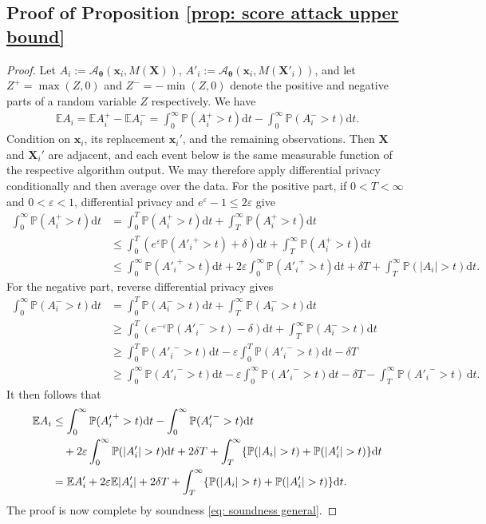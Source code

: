 \documentclass[letterpaper,12pt]{article}
\renewcommand{\d}{\mathrm{d}}
\numberwithin{equation}{section}
\theoremstyle{plain}
\numberwithin{Theorem}{section}
\numberwithin{proposition}{section}
\numberwithin{Lemma}{section}
{
	\theoremstyle{definition}
	\newtheorem{Definition}{Definition}
	\newtheorem{example}{Example}
	\numberwithin{example}{section}
	\newtheorem{fact}{Fact}
	\numberwithin{fact}{section}
	\newtheorem{remark}{Remark}
}
\newcommand{\rev}[1]{#1}
\newcommand{\A}{\mathcal{A}}
\newcommand{\Pro}{\mathbb{P}}
\newcommand{\1}{\mathbbm{1}}
\def\bth{{\boldsymbol{\theta}}}
\def\E{\mathbb{E}}
\begin{document}
\subsection{Proof of Proposition \ref{prop: score attack upper bound}}\label{sec: proof of prop: score attack upper bound}
\begin{proof}
	Let $A_i := \A_\bth (\bm x_i, M(\bm X))$, $A'_i := \A_\bth (\bm x_i, M(\bm X'_i))$, and let $Z^+ = \max(Z, 0)$ and $Z^- = -\min(Z, 0)$ denote the positive and negative parts of a \rev{random variable} $Z$ respectively. We have
	\begin{align*}
		\E A_i = \E A_i^+ - \E A_i^- = \int_0^\infty \Pro(A_i^+ > t) \d t - \int_0^\infty \Pro(A_i^- > t) \d t.
	\end{align*}
	Condition on $\bm x_i$, its replacement $\bm x_i'$, and the remaining observations. Then $\bm X$ and $\bm X_i'$ are adjacent, and each event below is the same measurable function of the respective algorithm output. We may therefore apply differential privacy conditionally and then average over the data.
		For the positive part, if $0 < T < \infty$ and $0 < \varepsilon < 1$, differential privacy and $e^\varepsilon-1\leq2\varepsilon$ give
	\begin{align*}
		\int_0^\infty \Pro(A_i^+ > t) \d t &= \int_0^T \Pro(A_i^+ > t) \d t + \int_T^\infty \Pro(A_i^+ > t) \d t \\
		&\leq \int_0^T \left(e^\varepsilon\Pro({A'_i}^+ > t) + \delta\right)\d t + \int_T^\infty \Pro(A_i^+ > t) \d t \\
		&\leq \int_0^\infty \Pro({A'_i}^+ > t) \d t + 2\varepsilon\int_0^\infty \Pro({A'_i}^+ > t) \d t + \delta T + \int_T^\infty \Pro(|A_i| > t) \d t.
	\end{align*}
		For the negative part, reverse differential privacy gives
	\begin{align*}
		\int_0^\infty \Pro(A_i^- > t) \d t &= \int_0^T \Pro(A_i^- > t) \d t + \int_T^\infty \Pro(A_i^- > t) \d t \\
			& \geq \int_0^T \left(e^{-\varepsilon} \Pro({A'_i}^- > t) - \delta\right)\d t + \int_T^\infty \Pro(A_i^- > t) \d t \\
			&\geq \int_0^T \Pro({A'_i}^- > t) \d t - \varepsilon\int_0^T \Pro({A'_i}^- > t) \d t- \delta T \\
			&\geq \int_0^\infty \Pro({A'_i}^- > t) \d t - \varepsilon\int_0^\infty \Pro({A'_i}^- > t) \d t- \delta T
			-\int_T^\infty\Pro({A'_i}^->t)\,\d t.
	\end{align*}
	It then follows that
	\begin{align} \label{eq: score attack upper bound intermediate step}
		\E A_i &\leq \int_0^\infty \Pro({A'_i}^+ > t) \d t
		- \int_0^\infty \Pro({A'_i}^- > t) \d t \notag\\
			&\quad + 2\varepsilon \int_0^\infty \Pro(|A'_i| > t) \d t
			+ 2\delta T + \int_T^\infty \{\Pro(|A_i| > t)+\Pro(|A'_i|>t)\} \d t \notag \\
			&= \E A'_i + \rev{2\varepsilon\E|A'_i|} + 2\delta T
			+ \int_T^\infty \{\Pro(|A_i| > t)+\Pro(|A'_i|>t)\} \d t .
	\end{align}
	The proof is now complete by soundness \eqref{eq: soundness general}.
\end{proof}
\end{document}
